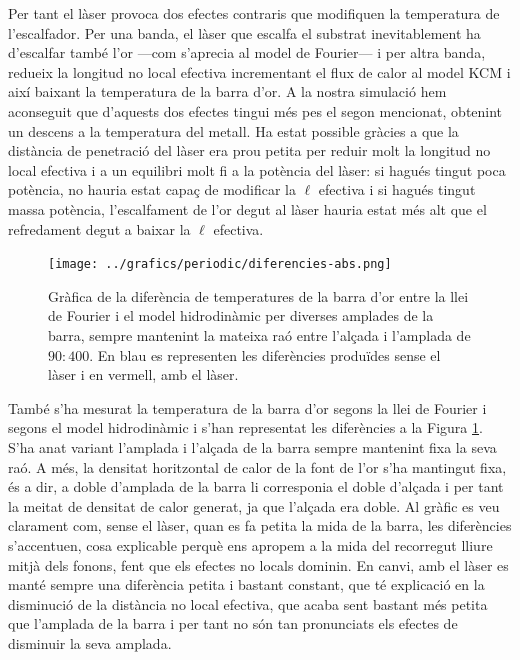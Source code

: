 \documentclass{article}
\begin{document}
Per tant el l\`{a}ser provoca dos efectes contraris que modifiquen la temperatura de l'escalfador. Per una banda, el l\`{a}ser que escalfa el substrat inevitablement ha d'escalfar tamb\'{e} l'or ---com s'aprecia al model de Fourier--- i per altra banda, redueix la longitud no local efectiva incrementant el flux de calor al model KCM i aix\'{i} baixant la temperatura de la barra d'or. A la nostra simulaci\'{o} hem aconseguit que d'aquests dos efectes tingui m\'{e}s pes el segon mencionat, obtenint un descens a la temperatura del metall. Ha estat possible gr\`{a}cies a que la dist\`{a}ncia de penetraci\'{o} del l\`{a}ser era prou petita per reduir molt la longitud no local efectiva i a un equilibri molt fi a la pot\`{e}ncia del l\`{a}ser: si hagu\'{e}s tingut poca pot\`{e}ncia, no hauria estat capa\c{c} de modificar la $\ell$ efectiva i si hagu\'{e}s tingut massa pot\`{e}ncia, l'escalfament de l'or degut al l\`{a}ser hauria estat m\'{e}s alt que el refredament degut a baixar la $\ell$ efectiva.

\begin{figure}[ht!]
\begin{center}
\texttt{[image: ../grafics/periodic/diferencies-abs.png]}
\caption{Gr\`{a}fica de la difer\`{e}ncia de temperatures de la barra d'or entre la llei de Fourier i el model hidrodin\`{a}mic per diverses amplades de la barra, sempre mantenint la mateixa ra\'{o} entre l'al\c{c}ada i l'amplada de $90:400$. En blau es representen les difer\`{e}ncies produ\"{i}des sense el l\`{a}ser i en vermell, amb el l\`{a}ser.}
\label{Fig:Diferencies}
\end{center}
\end{figure}

Tamb\'{e} s'ha mesurat la temperatura de la barra d'or segons la llei de Fourier i segons el model hidrodin\`{a}mic i s'han representat les difer\`{e}ncies a la Figura \ref{Fig:Diferencies}. S'ha anat variant l'amplada i l'al\c{c}ada de la barra sempre mantenint fixa la seva ra\'{o}. A m\'{e}s, la densitat horitzontal de calor de la font de l'or s'ha mantingut fixa, \'{e}s a dir, a doble d'amplada de la barra li corresponia el doble d'al\c{c}ada i per tant la meitat de densitat de calor generat, ja que l'al\c{c}ada era doble. Al gr\`{a}fic es veu clarament com, sense el l\`{a}ser, quan es fa petita la mida de la barra, les difer\`{e}ncies s'accentuen, cosa explicable perqu\`{e} ens apropem a la mida del recorregut lliure mitj\`{a} dels fonons, fent que els efectes no locals dominin. En canvi, amb el l\`{a}ser es mant\'{e} sempre una difer\`{e}ncia petita i bastant constant, que t\'{e} explicaci\'{o} en la disminuci\'{o} de la dist\`{a}ncia no local efectiva, que acaba sent bastant m\'{e}s petita que l'amplada de la barra i per tant no s\'{o}n tan pronunciats els efectes de disminuir la seva amplada.
\end{document}
